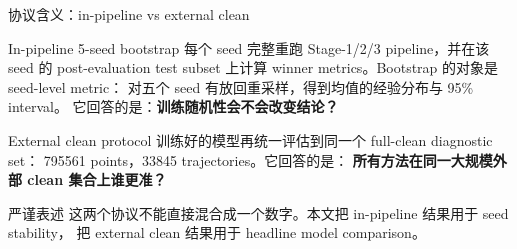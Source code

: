 \documentclass[aspectratio=169,11pt]{beamer}
\begin{document}
\begin{frame}{协议含义：in-pipeline vs external clean}
\small
\begin{block}{In-pipeline 5-seed bootstrap}
\footnotesize
每个 seed 完整重跑 Stage-1/2/3 pipeline，并在该 seed 的 post-evaluation
test subset 上计算 winner metrics。Bootstrap 的对象是 seed-level metric：
对五个 seed 有放回重采样，得到均值的经验分布与 95\% interval。
它回答的是：\textbf{训练随机性会不会改变结论？}
\end{block}

\begin{block}{External clean protocol}
\footnotesize
训练好的模型再统一评估到同一个 full-clean diagnostic set：
\num{795561} points，\num{33845} trajectories。它回答的是：
\textbf{所有方法在同一大规模外部 clean 集合上谁更准？}
\end{block}

\begin{block}{严谨表述}
\footnotesize
这两个协议不能直接混合成一个数字。本文把 in-pipeline 结果用于 seed stability，
把 external clean 结果用于 headline model comparison。
\end{block}
\end{frame}
\end{document}
